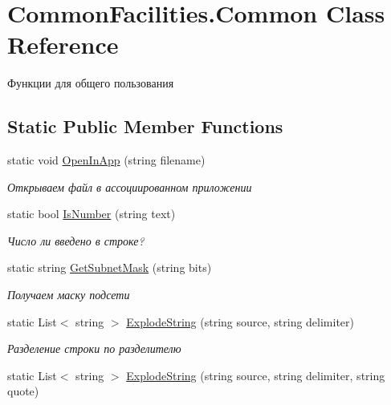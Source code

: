 \hypertarget{class_common_facilities_1_1_common}{
\section{CommonFacilities.Common Class Reference}
\label{class_common_facilities_1_1_common}
}


Функции для общего пользования  


\subsection*{Static Public Member Functions}
\begin{DoxyCompactItemize}
\item 
static void \hyperlink{class_common_facilities_1_1_common_af235757770ae7e5193e1da63f5cf7099}{OpenInApp} (string filename)
\begin{DoxyCompactList}\small\item\em Открываем файл в ассоциированном приложении \item\end{DoxyCompactList}\item 
static bool \hyperlink{class_common_facilities_1_1_common_acc685d82e65aa2bc23a7c8b29c4032d6}{IsNumber} (string text)
\begin{DoxyCompactList}\small\item\em Число ли введено в строке? \item\end{DoxyCompactList}\item 
static string \hyperlink{class_common_facilities_1_1_common_aadd8440e0701038354a3e1855c8b7654}{GetSubnetMask} (string bits)
\begin{DoxyCompactList}\small\item\em Получаем маску подсети \item\end{DoxyCompactList}\item 
static List$<$ string $>$ \hyperlink{class_common_facilities_1_1_common_a8b10297528cafddba8fa28c0a207becc}{ExplodeString} (string source, string delimiter)
\begin{DoxyCompactList}\small\item\em Разделение строки по разделителю \item\end{DoxyCompactList}\item 
static List$<$ string $>$ \hyperlink{class_common_facilities_1_1_common_a7a3e176f59c91495a57ff1ab7ebb7daa}{ExplodeString} (string source, string delimiter, string quote)

\end{DoxyCompactItemize}
